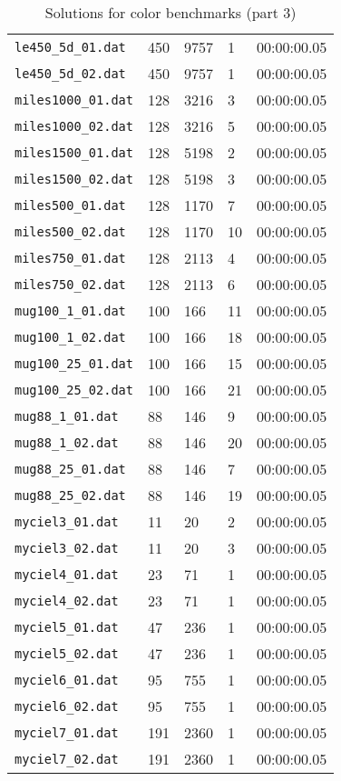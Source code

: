 \documentclass{article}
\begin{document}
\begin{table}
\begin{tabular}{y{3.6cm}x{1cm}x{1.5cm}x{1.5cm}y{1.5cm}}
    \verb|le450_5d_01.dat| & 450 & 9757 & 1 & 00:00:00.05 \\
    \verb|le450_5d_02.dat| & 450 & 9757 & 1 & 00:00:00.05 \\
    \verb|miles1000_01.dat| & 128 & 3216 & 3 & 00:00:00.05 \\
    \verb|miles1000_02.dat| & 128 & 3216 & 5 & 00:00:00.05 \\
    \verb|miles1500_01.dat| & 128 & 5198 & 2 & 00:00:00.05 \\
    \verb|miles1500_02.dat| & 128 & 5198 & 3 & 00:00:00.05 \\
    \verb|miles500_01.dat| & 128 & 1170 & 7 & 00:00:00.05 \\
    \verb|miles500_02.dat| & 128 & 1170 & 10 & 00:00:00.05 \\
    \verb|miles750_01.dat| & 128 & 2113 & 4 & 00:00:00.05 \\
    \verb|miles750_02.dat| & 128 & 2113 & 6 & 00:00:00.05 \\
    \verb|mug100_1_01.dat| & 100 & 166 & 11 & 00:00:00.05 \\
    \verb|mug100_1_02.dat| & 100 & 166 & 18 & 00:00:00.05 \\
    \verb|mug100_25_01.dat| & 100 & 166 & 15 & 00:00:00.05 \\
    \verb|mug100_25_02.dat| & 100 & 166 & 21 & 00:00:00.05 \\
    \verb|mug88_1_01.dat| & 88 & 146 & 9 & 00:00:00.05 \\
    \verb|mug88_1_02.dat| & 88 & 146 & 20 & 00:00:00.05 \\
    \verb|mug88_25_01.dat| & 88 & 146 & 7 & 00:00:00.05 \\
    \verb|mug88_25_02.dat| & 88 & 146 & 19 & 00:00:00.05 \\
    \verb|myciel3_01.dat| & 11 & 20 & 2 & 00:00:00.05 \\
    \verb|myciel3_02.dat| & 11 & 20 & 3 & 00:00:00.05 \\
    \verb|myciel4_01.dat| & 23 & 71 & 1 & 00:00:00.05 \\
    \verb|myciel4_02.dat| & 23 & 71 & 1 & 00:00:00.05 \\
    \verb|myciel5_01.dat| & 47 & 236 & 1 & 00:00:00.05 \\
    \verb|myciel5_02.dat| & 47 & 236 & 1 & 00:00:00.05 \\
    \verb|myciel6_01.dat| & 95 & 755 & 1 & 00:00:00.05 \\
    \verb|myciel6_02.dat| & 95 & 755 & 1 & 00:00:00.05 \\
    \verb|myciel7_01.dat| & 191 & 2360 & 1 & 00:00:00.05 \\
    \verb|myciel7_02.dat| & 191 & 2360 & 1 & 00:00:00.05 \\
  \end{tabular}
  \caption{Solutions for color benchmarks (part 3)}
\end{table}
\end{document}
